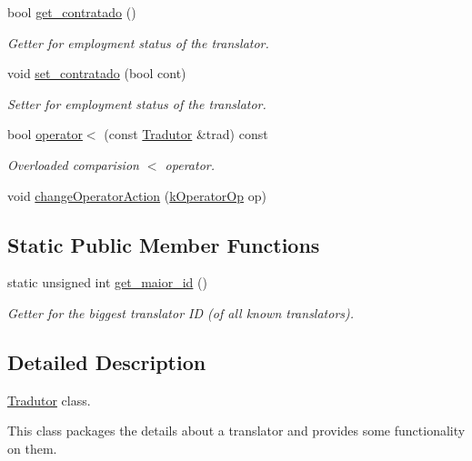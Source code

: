 \begin{DoxyCompactItemize}
bool \hyperlink{class_tradutor_abfd51adb78973d8bbc3bbd35eb5d5b94}{get\-\_\-contratado} ()
\begin{DoxyCompactList}\small\item\em Getter for employment status of the translator. \end{DoxyCompactList}\item 
void \hyperlink{class_tradutor_a00b1ffa1dc1a0eb9fabf6e240a61b94b}{set\-\_\-contratado} (bool cont)
\begin{DoxyCompactList}\small\item\em Setter for employment status of the translator. \end{DoxyCompactList}\item 
bool \hyperlink{class_tradutor_a33f43a54dbef52d8a25796c5ecd6c00a}{operator$<$} (const \hyperlink{class_tradutor}{Tradutor} \&trad) const 
\begin{DoxyCompactList}\small\item\em Overloaded comparision $<$ operator. \end{DoxyCompactList}\item 
void \hyperlink{class_tradutor_a0478428426465ec21880ad0066501123}{change\-Operator\-Action} (\hyperlink{_tradutor_8h_a5f121f8f8a3004c289fc2f33c3baa5d0}{k\-Operator\-Op} op)
\end{DoxyCompactItemize}
\subsection*{Static Public Member Functions}
\begin{DoxyCompactItemize}
\item 
static unsigned int \hyperlink{class_tradutor_af2caad7e33c443f238851c5bb2d63930}{get\-\_\-maior\-\_\-id} ()
\begin{DoxyCompactList}\small\item\em Getter for the biggest translator I\-D (of all known translators). \end{DoxyCompactList}\end{DoxyCompactItemize}


\subsection{Detailed Description}
\hyperlink{class_tradutor}{Tradutor} class. 

This class packages the details about a translator and provides some functionality on them. 

